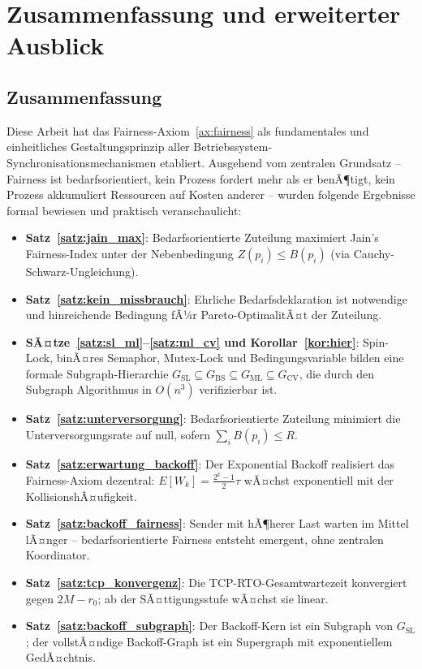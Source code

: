 ﻿\documentclass[a4paper,12pt]{article}
\theoremstyle{definition}
\begin{document}
\section{Zusammenfassung und erweiterter Ausblick}
\label{sec:ausblick}

\subsection{Zusammenfassung}

Diese Arbeit hat das Fairness-Axiom~\ref{ax:fairness} als
fundamentales und einheitliches Gestaltungsprinzip aller
Betriebssystem-Synchronisationsmechanismen etabliert.
Ausgehend vom zentralen Grundsatz -- Fairness ist
bedarfsorientiert, kein Prozess fordert mehr als er benÃ¶tigt,
kein Prozess akkumuliert Ressourcen auf Kosten anderer --
wurden folgende Ergebnisse formal bewiesen und praktisch
veranschaulicht:

\begin{itemize}
  \item \textbf{Satz~\ref{satz:jain_max}}: Bedarfsorientierte
        Zuteilung maximiert Jain's Fairness-Index unter der
        Nebenbedingung $Z(p_i) \leq B(p_i)$ (via
        Cauchy-Schwarz-Ungleichung).
  \item \textbf{Satz~\ref{satz:kein_missbrauch}}: Ehrliche
        Bedarfsdeklaration ist notwendige und hinreichende
        Bedingung fÃ¼r Pareto-OptimalitÃ¤t der Zuteilung.
  \item \textbf{SÃ¤tze~\ref{satz:sl_ml}--\ref{satz:ml_cv}
        und Korollar~\ref{kor:hier}}: Spin-Lock, binÃ¤res
        Semaphor, Mutex-Lock und Bedingungsvariable bilden
        eine formale Subgraph-Hierarchie
        $G_{\mathrm{SL}} \subseteq G_{\mathrm{BS}}
        \subseteq G_{\mathrm{ML}} \subseteq G_{\mathrm{CV}}$,
        die durch den Subgraph Algorithmus in $O(n^3)$
        verifizierbar ist.
  \item \textbf{Satz~\ref{satz:unterversorgung}}: Bedarfsorientierte
        Zuteilung minimiert die Unterversorgungsrate auf null,
        sofern $\sum_i B(p_i) \leq R$.
  \item \textbf{Satz~\ref{satz:erwartung_backoff}}: Der
        Exponential Backoff realisiert das Fairness-Axiom
        dezentral: $E[W_k] = \frac{2^k-1}{2}\tau$ wÃ¤chst
        exponentiell mit der KollisionshÃ¤ufigkeit.
  \item \textbf{Satz~\ref{satz:backoff_fairness}}: Sender
        mit hÃ¶herer Last warten im Mittel lÃ¤nger -- bedarfsorientierte
        Fairness entsteht emergent, ohne zentralen Koordinator.
  \item \textbf{Satz~\ref{satz:tcp_konvergenz}}: Die TCP-RTO-Gesamtwartezeit
        konvergiert gegen $2M - r_0$; ab der SÃ¤ttigungsstufe
        wÃ¤chst sie linear.
  \item \textbf{Satz~\ref{satz:backoff_subgraph}}: Der
        Backoff-Kern ist ein Subgraph von $G_{\mathrm{SL}}$;
        der vollstÃ¤ndige Backoff-Graph ist ein Supergraph
        mit exponentiellem GedÃ¤chtnis.
\end{itemize}
\end{document}
